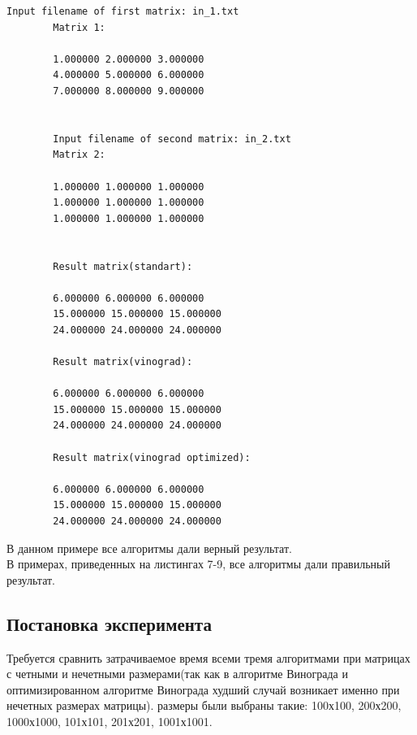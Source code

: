 \documentclass[a4paper, 14pt]{article}
\begin{document}
		\begin{lstlisting}[label=some-code,caption=Пример работы 3]		
		Input filename of first matrix: in_1.txt
		Matrix 1:

		1.000000 2.000000 3.000000 
		4.000000 5.000000 6.000000 
		7.000000 8.000000 9.000000 


		Input filename of second matrix: in_2.txt
		Matrix 2:

		1.000000 1.000000 1.000000 
		1.000000 1.000000 1.000000 
		1.000000 1.000000 1.000000 


		Result matrix(standart):
	
		6.000000 6.000000 6.000000 
		15.000000 15.000000 15.000000 
		24.000000 24.000000 24.000000 

		Result matrix(vinograd):

		6.000000 6.000000 6.000000 
		15.000000 15.000000 15.000000 
		24.000000 24.000000 24.000000 

		Result matrix(vinograd optimized):

		6.000000 6.000000 6.000000 
		15.000000 15.000000 15.000000 
		24.000000 24.000000 24.000000 
		\end{lstlisting}
		В данном примере все алгоритмы дали верный результат.\\
		В примерах, приведенных на листингах 7-9, все алгоритмы дали правильный результат.
		\subsection{Постановка эксперимента}
		\parindent=1cm
		Требуется сравнить затрачиваемое время всеми тремя алгоритмами при матрицах с четными и нечетными размерами(так как в алгоритме Винограда и оптимизированном алгоритме Винограда худший случай возникает именно при нечетных размерах матрицы). размеры были выбраны такие: 100х100, 200х200, 1000х1000, 101х101, 201х201, 1001х1001.
\end{document}
